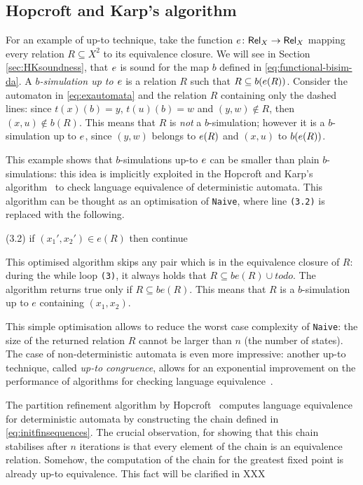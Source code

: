 \documentclass{llncs}
\begin{document}
\subsection{Hopcroft and Karp's algorithm}\label{ssec:HK}
For an example of  up-to technique, take the function
$e\colon \mathsf{Rel}_X \to \mathsf{Rel}_X$ mapping every relation $R\subseteq X^2$
to its equivalence closure. We will see in Section \ref{sec:HKsoundness}, that $e$ is sound for the map $b$ defined in \eqref{eq:functional-bisim-da}. A \emph{$b$-simulation up to $e$} is a
relation $R$ such that $R\subseteq b (e (R))$.
Consider the automaton in \eqref{eq:exautomata} and the relation $R$
containing only the dashed lines: since $t(x)(b)=y$, $t(u)(b)=w$ and
$(y,w)\notin R$, then $(x,u)\notin b(R)$. This means that $R$ is
\emph{not} a $b$-simulation; however it is a $b$-simulation up to $e$,
since $(y,w)$ belongs to $e (R)$ and $(x,u)$ to $b(e(R))$.


This example shows that $b$-simulations up-to $e$ can be smaller than plain $b$-simulations: this idea is implicitly exploited in the Hopcroft and Karp's algorithm~\cite{HopcroftKarp} to check language equivalence of deterministic automata. This algorithm can be thought as an optimisation of \texttt{Naive}, where line \texttt{(3.2)} is replaced with the following.
%
\begin{codeNT}
   (3.2)  if $(x_1',x_2')\in e(R)$ then continue
\end{codeNT}
This optimised algorithm skips any pair which is in the equivalence closure of $R$: during the while loop \texttt{(3)}, it always holds that
 $R\subseteq be(R) \cup todo$. The algorithm returns true only if $R\subseteq be(R)$. This means that $R$ is a $b$-simulation up to $e$ containing $(x_1,x_2)$.

This simple optimisation allows to reduce the worst case complexity of \texttt{Naive}: the size of the returned relation $R$ cannot be larger than $n$ (the number of states).
The case of non-deterministic automata is even more impressive:
another up-to technique, called \emph{up-to congruence}, allows for
an exponential improvement on the performance of algorithms for 
checking language equivalence~\cite{bp:popl13:hkc}. 

\begin{remark}\label{rmk:hopcroft}
The partition refinement algorithm by Hopcroft~\cite{hopcroft1971n} computes language equivalence for deterministic automata by constructing the chain defined in \eqref{eq:initfinsequences}. The crucial observation, for showing that this chain stabilises after $n$ iterations is that every element of the chain is an equivalence relation. Somehow, the computation of the chain for the greatest fixed point is already up-to equivalence. This fact will be clarified in XXX 
\end{remark}
\end{document}
